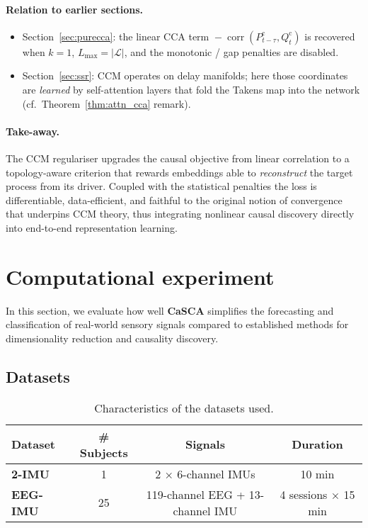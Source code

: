 \documentclass[14pt]{extarticle}
\begin{document}
	\paragraph{Relation to earlier sections.}
	\begin{itemize}[leftmargin=1.4em,itemsep=0.1em]
		\item Section~\ref{sec:purecca}: the linear CCA term
		$\!-\!\operatorname{corr}(P^{\mathrm c}_{t-\tau},Q^{\mathrm c}_t)$
		is recovered when $k=1$, $L_{\max}=|\mathcal L|$, and the
		monotonic / gap penalties are disabled.
		\item Section~\ref{sec:ssr}: CCM operates on delay manifolds; here those
		coordinates are \emph{learned} by self-attention layers
		that fold the Takens map into the network
		(cf.\ Theorem~\ref{thm:attn_cca} remark).
	\end{itemize}
	
	\paragraph{Take-away.}
	The CCM regulariser upgrades the causal objective from linear
	correlation to a topology-aware criterion that rewards embeddings able
	to \emph{reconstruct} the target process from its driver.
	Coupled with the statistical penalties the loss is differentiable,
	data-efficient, and faithful to the original notion of convergence that
	underpins CCM theory, thus integrating nonlinear causal discovery
	directly into end-to-end representation learning.
	
	\section{Computational experiment} \label{sec:experiments}
	In this section, we evaluate how well \textbf{CaSCA} simplifies the forecasting and classification of real-world sensory signals compared to established methods for dimensionality reduction and causality discovery.
	
	\subsection{Datasets}
	
	\begin{table}[h!]
		\centering
		\renewcommand{\arraystretch}{1.15}
		\begin{tabular}{@{}lccc@{}}
			\toprule
			\textbf{Dataset} & \textbf{\# Subjects} & \textbf{Signals} & \textbf{Duration} \\
			\midrule
			\textbf{2-IMU} & 1 & 2 × 6-channel IMUs & 10 min \\
			\textbf{EEG-IMU} & 25 & 119-channel EEG + 13-channel IMU & 4 sessions × 15 min \\
			\bottomrule
		\end{tabular}
		\caption{Characteristics of the datasets used.}
	\end{table}
	
\end{document}
